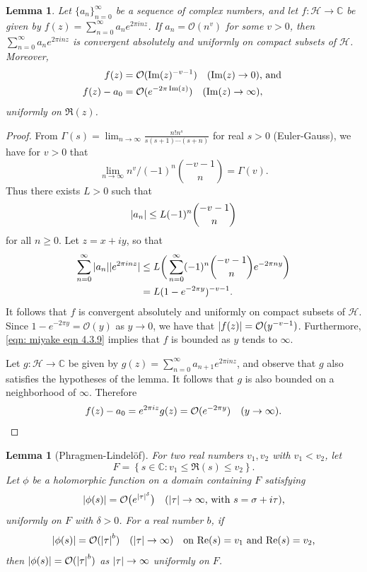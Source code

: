 \documentclass[10pt,leqno,twoside]{article}
\theoremstyle{plain}
\newtheorem{lemma}[lem]{Lemma}
\theoremstyle{definition}
\numberwithin{equation}{section}
\numberwithin{lem}{section}
\newcommand{\cbr}[1]{\left\{#1\right\}}
\begin{document}
\begin{lemma}\label{lem: miyake lem 4.3.3}
    Let $\{a_n\}_{n=0}^\infty$ be a sequence of complex numbers, and let $f\colon \mathcal H\to \mathbb C$ be given by $f(z) = \sum_{n=0}^\infty a_ne^{2\pi i nz}$. If $a_n = \mathcal O(n^v)$ for some $v >0$, then $\sum_{n=0}^\infty a_ne^{2\pi i nz}$ is convergent absolutely and uniformly on compact subsets of $\mathcal H$. Moreover, 
    \begin{align*}
        f(z) &= \mathcal O(\Im(z)^{-v-1}) \quad\textup{($\Im(z) \to 0$), and }\\
        f(z) - a_0 &= \mathcal O(e^{-2\pi \Im(z)}) \quad\textup{($\Im(z) \to \infty$)},
    \end{align*}
    uniformly on $\Re(z)$.
\end{lemma}
\begin{proof}
    From $\varGamma(s) = \lim_{n\to \infty}\frac{n!n^s}{s(s+1)\cdots(s+n)}$ for real $s>0$ (Euler-Gauss), we have for $v>0$ that
    \[\lim_{n\to\infty} n^v/(-1)^n\binom{-v-1}{n} = \varGamma(v).\]
    Thus there exists $L>0$ such that 
    \[\abs{a_n}\leq L(-1)^n\binom{-v-1}{n}\] for all $n\geq 0$. Let $z = x+iy$, so that 
    \begin{align}\label{eqn: miyake eqn 4.3.9}
        \sum_{n=0}^\infty\abs{a_n}|e^{2\pi i n z}|&\leq L\bigg(\sum_{n=0}^\infty (-1)^n\binom{-v-1}{n}e^{-2\pi n y}\bigg)\\
        &= L(1-e^{-2\pi y})^{-v-1}.\nonumber
    \end{align}
    It follows that $f$ is convergent absolutely and uniformly on compact subsets of $\mathcal H$. Since $1-e^{-2\pi y} = \mathcal O(y)$ as $y\to 0$, we have that $\abs{f(z)} = \mathcal O(y^{-v-1})$. Furthermore, \cref{eqn: miyake eqn 4.3.9} implies that $f$ is bounded as $y$ tends to $\infty$.

    Let $g\colon\mathcal H\to\mathbb C$ be given by $g(z) = \sum_{n=0}^\infty a_{n+1}e^{2\pi i nz}$, and observe that $g$ also satisfies the hypotheses of the lemma. It follows that $g$ is also bounded on a neighborhood of $\infty$. Therefore 
    \[f(z)-a_0 = e^{2\pi i z}g(z) = \mathcal O(e^{-2\pi y})\quad (y\to \infty).\qedhere\]
\end{proof}
\begin{lemma}[Phragmen-Lindel\"of]\label{lem: miyake lem 4.3.4}
    For two real numbers $v_1,v_2$ with $v_1<v_2$, let 
    \[F = \cbr{s\in \mathbb C : v_1\leq \Re(s)\leq v_2}.\] Let $\phi$ be a holomorphic function on a domain containing $F$ satisfying \[\abs{\phi(s)} = \mathcal O\big(e^{\abs{\tau}^\delta}\big)\quad \textup{($\abs{\tau}\to\infty$, with $s = \sigma + i\tau$),}\]
    uniformly on $F$ with $\delta >0$. For a real number $b$, if 
    \[\abs{\phi(s)} = \mathcal O(\abs{\tau}^b)\quad (\abs{\tau}\to\infty) \quad \text{on $\Re(s) = v_1$ and $\Re(s) = v_2$,}\]
    then $\abs{\phi(s)} = \mathcal O(\abs{\tau}^b)$ as $\abs{\tau}\to\infty$ uniformly on $F$.
\end{lemma}
\end{document}
